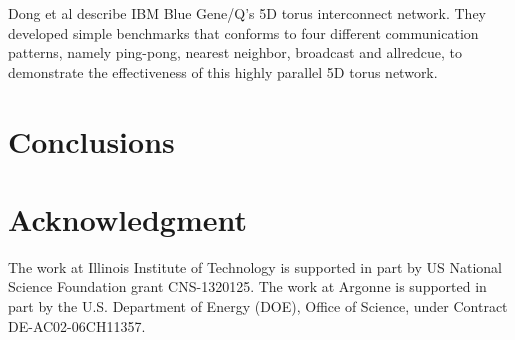 \documentclass[conference]{IEEEtran}
\begin{document}
Dong et al describe IBM Blue Gene/Q's 5D torus interconnect
network\cite{Dong-SC11}. They developed simple benchmarks that conforms to four
different communication patterns, namely ping-pong, nearest neighbor, broadcast
and allredcue, to demonstrate the effectiveness of this highly parallel 5D torus
network.



\section{Conclusions}
\label{sec:conclusion}


\section*{Acknowledgment}
\label{sec: ack}
The work at Illinois Institute of Technology is supported in part by
US National Science Foundation grant CNS-1320125. The work at Argonne is
supported in part by the U.S. Department of Energy (DOE), Office of Science,
under Contract DE-AC02-06CH11357.
\end{document}
